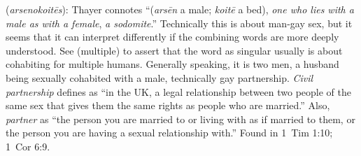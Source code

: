 \item[Gay-partner,]

(\textit{arsenokoitēs}):
Thayer connotes ``(\emph{arsēn} a male; \emph{koitē} a bed), \emph{one who lies with a male as with a female}, \emph{a sodomite}.'' Technically this is about man-gay sex, but it seems that it can interpret differently if the combining words are more deeply understood. See  (multiple) to assert that the word  as singular usually is about cohabiting for multiple humans. Generally speaking, it is two men, a husband being sexually cohabited with a male, technically gay partnership. \emph{Civil partnership} defines as ``in the UK, a legal relationship between two people of the same sex that gives them the same rights as people who are married.'' Also, \emph{partner} as ``the person you are married to or living with as if married to them, or the person you are having a sexual relationship with.''
Found in 1~Tim 1:10; 1~Cor 6:9.
